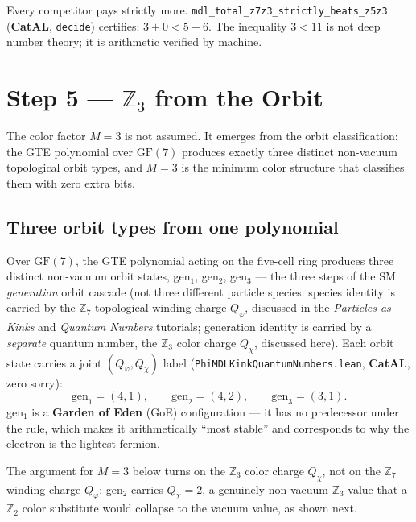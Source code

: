 \documentclass[11pt,a4paper]{article}
\newcommand{\term}[1]{\textbf{#1}}
\newcommand{\lean}[1]{\texttt{#1}}
\newcommand{\CatAL}{\textbf{CatAL}}
\theoremstyle{definition}
\begin{document}
\bigskip
{\sloppy
Every competitor pays strictly more.
\lean{mdl\_total\_z7z3\_strictly\_beats\_z5z3} (\CatAL, \texttt{decide})
certifies: $3 + 0 < 5 + 6$.  The inequality $3 < 11$ is not deep number
theory; it is arithmetic verified by machine.
\par}

\section{Step 5 — \texorpdfstring{$\mathbb{Z}_3$}{Z3} from the Orbit}
\label{sec:step5}

\begin{tcolorbox}[colback=boxpurple,colframe=purple!50!black,
  title={Step~5 claim}]
The color factor $M = 3$ is not assumed.  It emerges from the orbit
classification: the GTE polynomial over $\mathrm{GF}(7)$ produces
exactly three distinct non-vacuum topological orbit types, and $M = 3$
is the minimum color structure that classifies them with zero extra bits.
\end{tcolorbox}

\subsection{Three orbit types from one polynomial}

Over $\mathrm{GF}(7)$, the GTE polynomial acting on the five-cell ring
produces three distinct non-vacuum orbit states, gen$_1$, gen$_2$, gen$_3$
--- the three steps of the SM \emph{generation} orbit cascade (not three
different particle species: species identity is carried by the $\mathbb{Z}_7$
topological winding charge $Q_\varphi$, discussed in the \emph{Particles as
Kinks} and \emph{Quantum Numbers} tutorials; generation identity is carried
by a \emph{separate} quantum number, the $\mathbb{Z}_3$ color charge
$Q_\chi$, discussed here).  Each orbit state carries a joint
$(Q_\varphi, Q_\chi)$ label
(\lean{PhiMDLKinkQuantumNumbers.lean}, \CatAL, zero sorry):
\[
  \mathrm{gen}_1 = (4,1), \qquad \mathrm{gen}_2 = (4,2), \qquad
  \mathrm{gen}_3 = (3,1).
\]
gen$_1$ is a \term{Garden of Eden} (GoE) configuration --- it has no
predecessor under the rule, which makes it arithmetically ``most stable''
and corresponds to why the electron is the lightest fermion.

The argument for $M=3$ below turns on the $\mathbb{Z}_3$ color charge
$Q_\chi$, not on the $\mathbb{Z}_7$ winding charge $Q_\varphi$: gen$_2$
carries $Q_\chi = 2$, a genuinely non-vacuum $\mathbb{Z}_3$ value that a
$\mathbb{Z}_2$ color substitute would collapse to the vacuum value, as
shown next.
\end{document}
